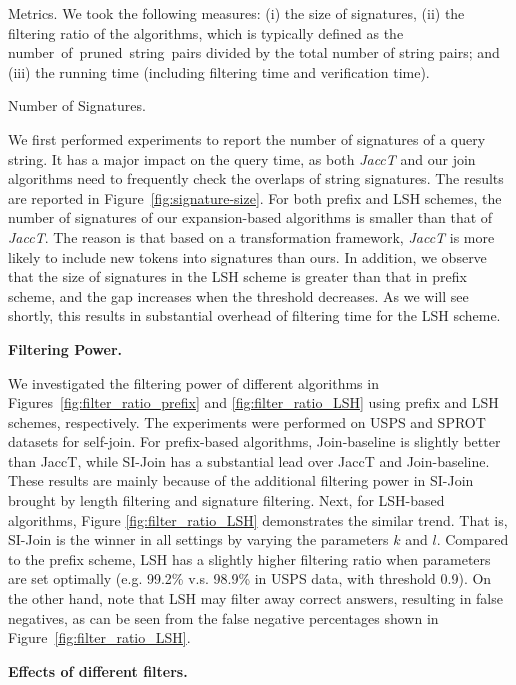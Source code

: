 Metrics. We took the following measures: (i) the size of signatures, (ii) the filtering ratio of the algorithms, which is typically defined as the number~of~pruned~string~pairs divided by the total number of string pairs; and (iii) the running time (including filtering time and verification time).

Number of Signatures.


We first performed experiments to report the number of signatures of a
query string. It has a major impact on the query time, as both \textit{JaccT} and
our join algorithms need to frequently check the overlaps of string
signatures. The results are reported in Figure~\ref{fig:signature-size}.
For both prefix and LSH schemes, the number of signatures of our
expansion-based algorithms is smaller than that of \textit{JaccT}. The reason is
that based on a transformation framework, \textit{JaccT} is more likely to
include new tokens into signatures than ours. In addition, we observe
that the size of signatures in the LSH scheme is greater than that in
prefix scheme, and the gap increases when the threshold decreases. As we
will see shortly, this results in substantial overhead of filtering time
for the LSH scheme.


\textbf{Filtering Power.}

We investigated the filtering power of different algorithms in
Figures~\ref{fig:filter_ratio_prefix} and \ref{fig:filter_ratio_LSH} using
prefix and LSH schemes, respectively. The experiments were performed on
USPS and SPROT datasets for self-join. For prefix-based algorithms,
Join-baseline is slightly better than JaccT, while SI-Join has a substantial
lead over JaccT and Join-baseline. These results are mainly because of the
additional filtering power in SI-Join brought by length filtering and
signature filtering. Next, for LSH-based algorithms, Figure
\ref{fig:filter_ratio_LSH} demonstrates the similar trend. That is,
SI-Join is the winner in all settings by varying the parameters $k$ and
$l$. Compared to the prefix scheme, LSH has a slightly higher filtering
ratio when parameters are set optimally (e.g. 99.2\% v.s. 98.9\% in USPS
data, with threshold 0.9). On the other hand, note that LSH may filter
away correct answers, resulting in false negatives, as can be seen from
the false negative percentages shown in
Figure~\ref{fig:filter_ratio_LSH}.

\textbf{Effects of different filters.}

